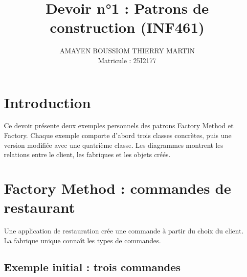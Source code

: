 \documentclass[11pt,a4paper]{article}
\title{Devoir n°1 : Patrons de construction (INF461)}
\author{AMAYEN BOUSSIOM THIERRY MARTIN\\Matricule : 25I2177}\date{}
\begin{document}
\maketitle
\section*{Introduction}
Ce devoir présente deux exemples personnels des patrons Factory Method et Factory. Chaque exemple comporte d'abord trois classes concrètes, puis une version modifiée avec une quatrième classe. Les diagrammes montrent les relations entre le client, les fabriques et les objets créés.

\section{Factory Method : commandes de restaurant}
Une application de restauration crée une commande à partir du choix du client. La fabrique unique connaît les types de commandes.
\subsection{Exemple initial : trois commandes}
\begin{center}\end{center}
\end{document}

